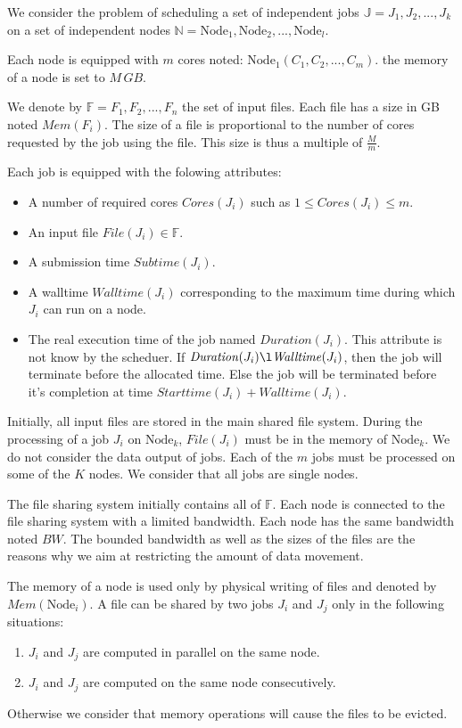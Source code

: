 \documentclass[conference,10pt]{IEEEtran}
\newcommand{\Node}[1]{\ensuremath{\mathrm{Node}_{#1}}\xspace}
\newcommand{\file}{\ensuremath{\mathit{File}}\xspace}
\newcommand{\memory}{\ensuremath{\mathit{Mem}}\xspace}
\newcommand{\duration}{\mathit{Duration}\xspace}
\newcommand{\bandwidth}{\mathit{BW}\xspace}
\newcommand{\core}{\mathit{Cores}\xspace}
\newcommand{\submissiontime}{\mathit{Subtime}\xspace}
\newcommand{\walltime}{\mathit{Walltime}\xspace}
\newcommand{\start}{\mathit{Starttime}\xspace}
\newcommand{\fileset}{\ensuremath{\mathbb{F}}\xspace}
\newcommand{\jobset}{\ensuremath{\mathbb{J}}\xspace}
\newcommand{\nodeset}{\ensuremath{\mathbb{N}}\xspace}
\begin{document}
We consider the problem of scheduling a set of independent jobs $\jobset = {J_1, J_2, ..., J_k}$ on
a set of independent nodes $\nodeset = {\Node{1}, \Node{2}, ..., \Node{l}}$.

Each node is equipped with $m$ cores noted: $\Node{1}(C_1, C_2, ..., C_m)$.
the memory of a node is set to $M\,GB$.

We denote by $\fileset = F_1, F_2, ..., F_n$ the set of input files.
Each file has a size in GB noted $\memory(F_i)$.
The size of a file is proportional to the number of cores requested by the job using the file.
This size is thus a multiple of $\frac{M}{m}$.

Each job is equipped with the folowing attributes:
\begin{itemize}
	\item A number of required cores $\core(J_i)$ such as $1 \leq \core(J_i) \leq m$.
	\item An input file $\file(J_i) \in \fileset$.
	\item A submission time $\submissiontime(J_i)$.
	\item A walltime $\walltime(J_i)$ corresponding to the maximum time during which $J_i$ can run on a node.
	\item The real execution time of the job named $\duration(J_i)$. This attribute is not know by the scheduer. If $\duration(J_i) \l \walltime(J_i)$, then the job will terminate before the allocated time. Else the job will be terminated before it's completion at time $\start(J_i) + \walltime(J_i)$.
\end{itemize}

Initially, all input files are stored in the main shared file system.
During the processing of a job $J_i$ on $\Node{k}$,
$\file(J_i)$ must be in the memory of $\Node{k}$. 
We do not consider the data output of jobs.
Each of the $m$ jobs must be processed on some of the $K$ nodes. 
We consider that all jobs are single nodes.

The file sharing system initially contains all of $\fileset$.
Each node is connected to the file sharing system with a limited bandwidth.
Each node has the same bandwidth noted $\bandwidth$.
The bounded bandwidth as well as the sizes of the files are the reasons why
we aim at restricting the amount of data movement.

The memory of a node is used only by physical writing of files and denoted by $\memory(\Node{i})$.
A file can be shared by two jobs $J_i$ and $J_j$ only in the following situations:
\begin{enumerate}
	\item $J_i$ and $J_j$ are computed in parallel on the same node.
	\item $J_i$ and $J_j$ are computed on the same node consecutively.
\end{enumerate}
Otherwise we consider that memory operations will cause the files to be evicted.
\end{document}
